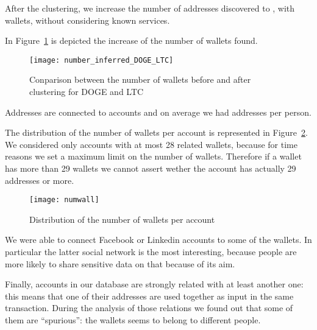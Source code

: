 After the clustering, we increase the number of addresses discovered to
\clusteringNumberAllWallets{}, with \clusteringNumberWalletsNotService{}
wallets, without considering known services.

In Figure~\ref{fig:dogeltcclustered} is depicted the increase of the number of
wallets found.
\begin{figure}[H]
\centering
\texttt{[image: number\_inferred\_DOGE\_LTC]}
\caption{Conparison between the number of wallets before and after clustering for DOGE and LTC}
\label{fig:dogeltcclustered}
\end{figure}

Addresses are connected to \accountNumber{} accounts and on average we had
\avarageAccount{} addresses per person.

The distribution of the number of wallets per account is represented in
Figure~\ref{fig:numwall}. We considered only accounts with at most 28 related
wallets, because for time reasons we set a maximum limit on the number of
wallets. Therefore if a wallet has more than 29 wallets we cannot assert wether
the account has actually 29 addresses or more.
\begin{figure}[H]
\centering
\texttt{[image: numwall]}
\caption{Distribution of the number of wallets per account}
\label{fig:numwall}
\end{figure}

We were able to connect Facebook or Linkedin accounts to some of the wallets.
In particular the latter social network is the most interesting, because people
are more likely to share sensitive data on that because of its aim. 

Finally, \accountRelated{} accounts in our database are strongly related with
at least another one: this means that one of their addresses are used together
as input in the same transaction. During the analysis of those relations we
found out that some of them are ``spurious'': the wallets seems to belong to
different people.
